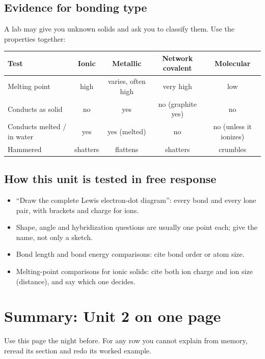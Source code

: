 \documentclass[11pt]{article}
\begin{document}
\subsection{Evidence for bonding type}
A lab may give you unknown solids and ask you to classify them. Use the properties together:
\begin{center}
\begin{tabular}{lcccc}\toprule
Test & Ionic & Metallic & Network covalent & Molecular \\ \midrule
Melting point & high & varies, often high & very high & low \\
Conducts as solid & no & yes & no (graphite yes) & no \\
Conducts melted / in water & yes & yes (melted) & no & no (unless it ionizes) \\
Hammered & shatters & flattens & shatters & crumbles \\ \bottomrule
\end{tabular}
\end{center}
\subsection{How this unit is tested in free response}
\begin{itemize}
\item ``Draw the complete Lewis electron-dot diagram'': every bond and every lone pair, with brackets and charge for ions.
\item Shape, angle and hybridization questions are usually one point each; give the name, not only a sketch.
\item Bond length and bond energy comparisons: cite bond order or atom size.
\item Melting-point comparisons for ionic solids: cite both ion charge and ion size (distance), and say which one decides.
\end{itemize}

\clearpage
\section*{Summary: Unit 2 on one page}
Use this page the night before. For any row you cannot explain from memory, reread its section and redo its worked example.
\end{document}
